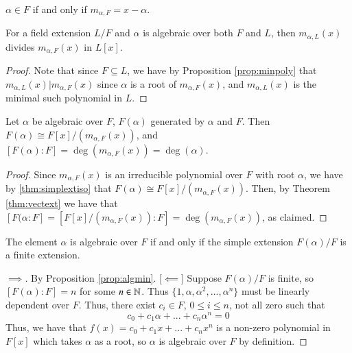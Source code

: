 \documentclass[12pt, a4paper, oneside, openright, titlepage]{book}
\begin{document}
\begin{cor}
    $\alpha \in F$ if and only if $m_{\alpha,F} = x-\alpha$.
\end{cor}


\begin{cor}
    For a field extension $L/F$ and $\alpha$ is algebraic over both $F$ and $L$, then $m_{\alpha,L}(x)$ divides $m_{\alpha,F}(x)$ in $L[x]$.
\end{cor}
\begin{proof}
    Note that since $F\subseteq L$, we have by Proposition \ref{prop:minpoly} that $m_{\alpha,L}(x) \vert m_{\alpha,F}(x)$ since $\alpha$ is a root of $m_{\alpha,F}(x)$, and $m_{\alpha,L}(x)$ is the minimal such polynomial in $L$.
\end{proof}



\begin{prop}\label{prop:algmin}
    Let $\alpha$ be algebraic over $F$, $F(\alpha)$ generated by $\alpha$ and $F$. Then $F(\alpha) \cong F[x]/(m_{\alpha,F}(x))$, and $[F(\alpha):F] = \deg(m_{\alpha,F}(x)) = \deg(\alpha)$.
\end{prop}
\begin{proof}
    Since $m_{\alpha,F}(x)$ is an irreducible polynomial over $F$ with root $\alpha$, we have by \ref{thm:simplextiso} that $F(\alpha) \cong F[x]/(m_{\alpha,F}(x))$. Then, by Theorem \ref{thm:vectext} we have that $[F(\alpha:F] = [F[x]/(m_{\alpha,F}(x)):F] = \deg(m_{\alpha,F}(x))$, as claimed.
\end{proof}



\begin{prop}
    The element $\alpha$ is algebraic over $F$ if and only if the simple extension $F(\alpha)/F$ is a finite extension.
\end{prop}
\begin{proof}
    [$\implies$] By Proposition \ref{prop:algmin}.
    [$\impliedby$] Suppose $F(\alpha)/F$ is finite, so $[F(\alpha):F] = n$ for some $n \in \mathbb N$. Thus $\{1,\alpha,\alpha^2,...,\alpha^n\}$ must be linearly dependent over $F$. Thus, there exist $c_i \in F$, $0 \leq i \leq n$, not all zero such that \begin{equation*}
        c_0 + c_1\alpha + ... + c_n\alpha^n = 0
    \end{equation*}
    Thus, we have that $f(x) = c_0+c_1x+...+c_nx^n$ is a non-zero polynomial in $F[x]$ which takes $\alpha$ as a root, so $\alpha$ is algebraic over $F$ by definition.
\end{proof}
\end{document}
